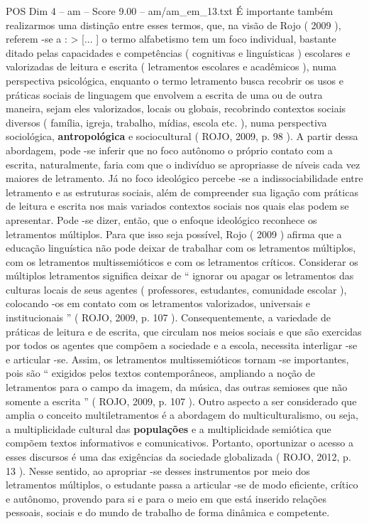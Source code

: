 \begin{textsample}{POS Dim 4 – am – Score 9.00 – am/am\_em\_13.txt}
É importante também realizarmos uma distinção entre esses termos, que, na visão de Rojo ( 2009 ), referem -se a : > [... ] o termo alfabetismo tem um foco individual, bastante ditado pelas capacidades e competências ( cognitivas e linguísticas ) escolares e valorizadas de leitura e escrita ( letramentos escolares e acadêmicos ), numa perspectiva psicológica, enquanto o termo letramento busca recobrir os usos e práticas sociais de linguagem que envolvem a escrita de uma ou de outra maneira, sejam eles valorizados, locais ou globais, recobrindo contextos sociais diversos ( família, igreja, trabalho, mídias, escola etc. ), numa perspectiva sociológica, \textbf{antropológica} e sociocultural ( ROJO, 2009, p. 98 ).
A partir dessa abordagem, pode -se inferir que no foco autônomo o próprio contato com a escrita, naturalmente, faria com que o indivíduo se apropriasse de níveis cada vez maiores de letramento.
Já no foco ideológico percebe -se a indissociabilidade entre letramento e as estruturas sociais, além de compreender sua ligação com práticas de leitura e escrita nos mais variados contextos sociais nos quais elas podem se apresentar.
Pode -se dizer, então, que o enfoque ideológico reconhece os letramentos múltiplos.
Para que isso seja possível, Rojo ( 2009 ) afirma que a educação linguística não pode deixar de trabalhar com os letramentos múltiplos, com os letramentos multissemióticos e com os letramentos críticos.
Considerar os múltiplos letramentos significa deixar de “ ignorar ou apagar os letramentos das culturas locais de seus agentes ( professores, estudantes, comunidade escolar ), colocando -os em contato com os letramentos valorizados, universais e institucionais ” ( ROJO, 2009, p. 107 ).
Consequentemente, a variedade de práticas de leitura e de escrita, que circulam nos meios sociais e que são exercidas por todos os agentes que compõem a sociedade e a escola, necessita interligar -se e articular -se.
Assim, os letramentos multissemióticos tornam -se importantes, pois são “ exigidos pelos textos contemporâneos, ampliando a noção de letramentos para o campo da imagem, da música, das outras semioses que não somente a escrita ” ( ROJO, 2009, p. 107 ).
Outro aspecto a ser considerado que amplia o conceito multiletramentos é a abordagem do multiculturalismo, ou seja, a multiplicidade cultural das \textbf{populações} e a multiplicidade semiótica que compõem textos informativos e comunicativos.
Portanto, oportunizar o acesso a esses discursos é uma das exigências da sociedade globalizada ( ROJO, 2012, p. 13 ).
Nesse sentido, ao apropriar -se desses instrumentos por meio dos letramentos múltiplos, o estudante passa a articular -se de modo eficiente, crítico e autônomo, provendo para si e para o meio em que está inserido relações pessoais, sociais e do mundo de trabalho de forma dinâmica e competente.

\end{textsample}
